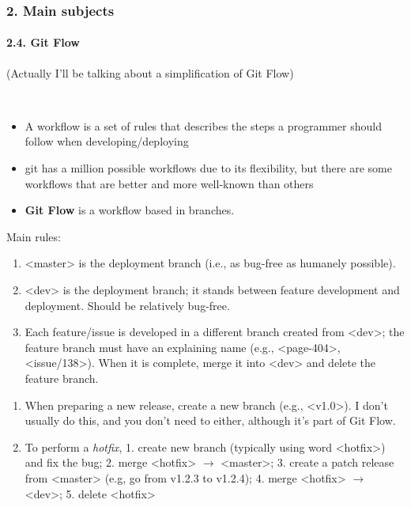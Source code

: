 \documentclass[dvipsnames]{beamer}
\def\texttt#1{<#1>}
\begin{document}
\begin{frame}
\frametitle{2. Main subjects}
\framesubtitle{2.4. Git Flow}

{\footnotesize (Actually I'll be talking about a simplification of Git Flow)}

~

\begin{itemize}
  \item A workflow is a set of rules that describes the steps a programmer should follow when developing/deploying

  \item git has a million possible workflows due to its flexibility, but there are some workflows that are better and more well-known than others

  \item \textbf{Git Flow} is a workflow based in branches.
\end{itemize}

\end{frame}

\begin{frame}
  \small

  Main rules:

  \begin{enumerate}
    \item \texttt{master} is the deployment branch (i.e., as bug-free as humanely possible).
    \item \texttt{dev} is the deployment branch; it stands between feature development and deployment. Should be relatively bug-free.
    \item Each feature/issue is developed in a different branch created from \texttt{dev}; the feature branch must have an explaining name (e.g., \texttt{page-404}, \texttt{issue/138}). When it is complete, merge it into \texttt{dev} and delete the feature branch.
  \end{enumerate}

  \begin{center}
    
  \end{center}
\end{frame}

\begin{frame}
  \small
  \begin{enumerate}
    
    \item When preparing a new release, create a new branch (e.g., \texttt{v1.0}). I don't usually do this, and you don't need to either, although it's part of Git Flow.
    \item To perform a \textit{hotfix}, 1. create new branch (typically using word \texttt{hotfix}) and fix the bug; 2. merge \texttt{hotfix} $\rightarrow$ \texttt{master}; 3. create a patch release from \texttt{master} (e.g, go from v1.2.3 to v1.2.4); 4. merge \texttt{hotfix} $\rightarrow$ \texttt{dev}; 5. delete \texttt{hotfix}
  \end{enumerate}

  \begin{center}
    
  \end{center}
\end{frame}
\end{document}
